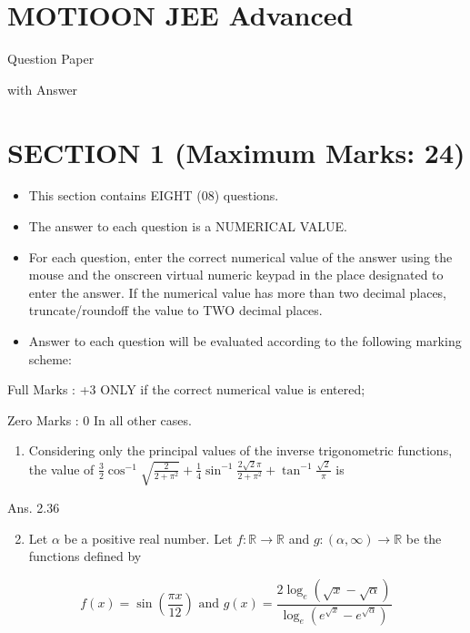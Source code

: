 \documentclass[10pt]{article}
\begin{document}
\section{MOTIOON JEE Advanced}
Question Paper

with Answer

\section{SECTION 1 (Maximum Marks: 24)}
\begin{itemize}
  \item This section contains EIGHT (08) questions.

  \item The answer to each question is a NUMERICAL VALUE.

  \item For each question, enter the correct numerical value of the answer using the mouse and the onscreen virtual numeric keypad in the place designated to enter the answer. If the numerical value has more than two decimal places, truncate/roundoff the value to TWO decimal places.

  \item Answer to each question will be evaluated according to the following marking scheme:

\end{itemize}

Full Marks : +3 ONLY if the correct numerical value is entered;

Zero Marks : 0 In all other cases.

\begin{enumerate}
  \item Considering only the principal values of the inverse trigonometric functions, the value of $\frac{3}{2} \cos ^{-1} \sqrt{\frac{2}{2+\pi^{2}}}+\frac{1}{4} \sin ^{-1} \frac{2 \sqrt{2} \pi}{2+\pi^{2}}+\tan ^{-1} \frac{\sqrt{2}}{\pi}$ is
\end{enumerate}

Ans. 2.36

\begin{enumerate}
  \setcounter{enumi}{1}
  \item Let $\alpha$ be a positive real number. Let $f: \mathbb{R} \rightarrow \mathbb{R}$ and $g:(\alpha, \infty) \rightarrow \mathbb{R}$ be the functions defined by
\end{enumerate}

$$
f(x)=\sin \left(\frac{\pi x}{12}\right) \text { and } g(x)=\frac{2 \log _{e}(\sqrt{x}-\sqrt{\alpha})}{\log _{e}\left(e^{\sqrt{x}}-e^{\sqrt{\alpha}}\right)}
$$
\end{document}
